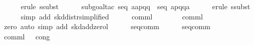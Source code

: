 \begin{isabellebody}
\ \ \ \ \isamarkupfalse%
\ {}erule\ ssubst{}\isanewline
\ \ \ \ \isamarkupfalse%
\ {}subgoal{}tac\ {}seq\ {}a{}{}{}a{}{}p{}{}{}q{}{}{}{}q{}{}{}{}\ {}\ seq\ {}a{}{}p{}{}{}q{}{}{}{}q{}{}{}{}{}a{}{}{}{}\isanewline
\ \ \ \ \isamarkupfalse%
\ {}erule\ ssubst{}\isanewline
\ \ \ \ \isamarkupfalse%
\ {}simp\ add{}\ skd{}distr{}simplified{}{}\isanewline
\ \ \ \ \isamarkupfalse%
\ {}comml{}\ {}\ {}{}\isanewline
\ \ \ \ \isamarkupfalse%
\ {}comml{}\ {}\ {}{}\isanewline
\ \ \ \ \isamarkupfalse%
\ {}zero{}\ auto\ simp\ add{}\ skd{}add{}zerol{}{}\isanewline
\ \ \ \ \isamarkupfalse%
\ seq{}comm\isanewline
\ \ \ \ \isamarkupfalse%
\ seq{}comm\isanewline
\ \ \ \ \isamarkupfalse%
\ {}comml{}\ {}\ {}{}\ cong{}\isanewline

\end{isabellebody}
